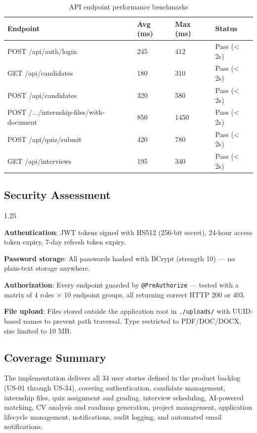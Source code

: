 \begin{table}[H]
\centering
\begin{tabular}{|p{5cm}|p{2.5cm}|p{2.5cm}|p{2.5cm}|}
\hline
\rowcolor{gray!20}
\textbf{Endpoint} & \textbf{Avg (ms)} & \textbf{Max (ms)} & \textbf{Status} \\
\hline
POST /api/auth/login & 245 & 412 & Pass (< 2s) \\
\hline
GET /api/candidates & 180 & 310 & Pass (< 2s) \\
\hline
POST /api/candidates & 320 & 580 & Pass (< 2s) \\
\hline
POST /.../internship-files/with-document & 850 & 1450 & Pass (< 2s) \\
\hline
POST /api/quiz/submit & 420 & 780 & Pass (< 2s) \\
\hline
GET /api/interviews & 195 & 340 & Pass (< 2s) \\
\hline
\end{tabular}
\caption{API endpoint performance benchmarks}
\end{table}

\subsection{Security Assessment}
\begin{itemize}[leftmargin=2cm, topsep=4pt]
    \begin{spacing}{1.25}
        \item \textbf{Authentication}: JWT tokens signed with HS512 (256-bit secret), 24-hour access token expiry, 7-day refresh token expiry.
        \item \textbf{Password storage}: All passwords hashed with BCrypt (strength 10) — no plain-text storage anywhere.
        \item \textbf{Authorization}: Every endpoint guarded by \texttt{@PreAuthorize} — tested with a matrix of 4 roles $\times$ 10 endpoint groups, all returning correct HTTP 200 or 403.
        \item \textbf{File upload}: Files stored outside the application root in \texttt{./uploads/} with UUID-based names to prevent path traversal. Type restricted to PDF/DOC/DOCX, size limited to 10 MB.
    \end{spacing}
\end{itemize}

\subsection{Coverage Summary}
The implementation delivers all 34 user stories defined in the product backlog (US-01 through US-34), covering authentication, candidate management, internship files, quiz assignment and grading, interview scheduling, AI-powered matching, CV analysis and roadmap generation, project management, application lifecycle management, notifications, audit logging, and automated email notifications.


